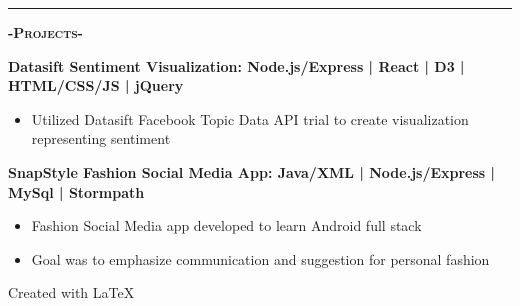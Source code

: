 \documentclass[12pt]{article}
\begin{document}
\noindent\rule{19cm}{0.4pt}

\begin{center}
\textbf{\textsc{-Projects-}}\\
\end{center}
\begin{footnotesize}

\flushleft

\color{Cerulean}\textbf{Datasift Sentiment Visualization: \hfill \color{TealBlue} Node.js/Express | React | D3 | HTML/CSS/JS | jQuery} 
\color{Black}
\begin{itemize}
	\item Utilized Datasift Facebook Topic Data API trial to create visualization representing sentiment 
\end{itemize}
\smallskip
\flushleft
\color{Cerulean}\textbf{SnapStyle Fashion Social Media App: \hfill\color{TealBlue} Java/XML | Node.js/Express | MySql | Stormpath } 
\color{Black}
\begin{itemize}
	\item Fashion Social Media app developed to learn Android full stack
	\item Goal was to emphasize communication and suggestion for personal fashion
\end{itemize}
\smallskip

\end{footnotesize}

\center
Created with \LaTeX
\end{document}

